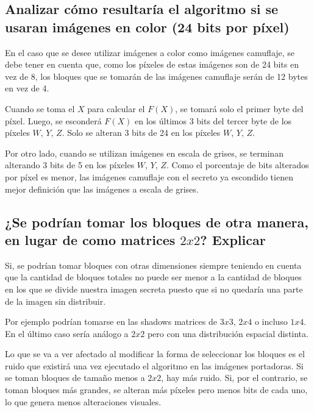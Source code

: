 \documentclass[11pt]{scrartcl} %
\begin{document}

\subsection{Analizar cómo resultaría el algoritmo si se usaran imágenes en color (24 bits por píxel)}

En el caso que se desee utilizar imágenes a color como imágenes camuflaje, se debe tener en cuenta que, como los píxeles de estas imágenes son de 24 bits en vez de 8, los bloques que se tomarán de las imágenes camuflaje serán de 12 bytes en vez de 4.

Cuando se toma el $X$ para calcular el $F(X)$, se tomará solo el primer byte del píxel. Luego, se esconderá $F(X)$ en los últimos 3 bits del tercer byte de los píxeles $W$, $Y$, $Z$. Solo se alteran 3 bits de 24 en los píxeles $W$, $Y$, $Z$.

Por otro lado, cuando se utilizan imágenes en escala de grises, se terminan alterando 3 bits de 5 en los píxeles $W$, $Y$, $Z$. Como el porcentaje de bits alterados por píxel es menor, las imágenes camuflaje con el secreto ya escondido tienen mejor definición que las imágenes a escala de grises.

\subsection{¿Se podrían tomar los bloques de otra manera, en lugar de como matrices $2x2$? Explicar}

Si, se podrían tomar bloques con otras dimensiones siempre teniendo en cuenta que la cantidad de bloques totales no puede ser menor a la cantidad de bloques en los que se divide nuestra imagen secreta puesto que si no quedaría una parte de la imagen sin distribuir. 

Por ejemplo podrían tomarse en las shadows matrices de $3x3$, $2x4$ o incluso $1x4$. En el último caso sería análogo a $2x2$ pero con una distribución espacial distinta.

Lo que se va a ver afectado al modificar la forma de seleccionar los bloques es el ruido que existirá una vez ejecutado el algoritmo en las imágenes portadoras. Si se toman bloques de tamaño menos a $2x2$, hay más ruido. Si, por el contrario, se toman bloques más grandes, se alteran más píxeles pero menos bits de cada uno, lo que genera menos alteraciones visuales.

\end{document}
